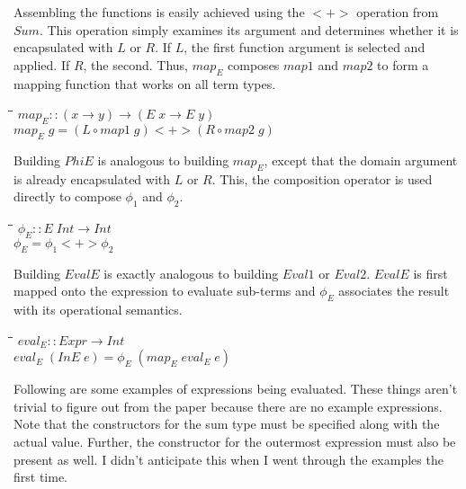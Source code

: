 \documentclass[10pt]{article}
\newlength{\lwidth}\setlength{\lwidth}{4.5cm}
\newlength{\cwidth}\setlength{\cwidth}{8mm} %
\newcommand{\Conid}[1]{\mathit{#1}}
\newcommand{\Varid}[1]{\mathit{#1}}
\begin{document}
Assembling the functions is easily achieved using the \ensuremath{\mathbin{<+>}} operation
from \ensuremath{\Conid{Sum}}.  This operation simply examines its argument and
determines whether it is encapsulated with \ensuremath{\Conid{L}} or \ensuremath{\Conid{R}}. If \ensuremath{\Conid{L}}, the
first function argument is selected and applied.  If \ensuremath{\Conid{R}}, the second.
Thus, \ensuremath{\Varid{map}_E} composes \ensuremath{\Varid{map1}} and \ensuremath{\Varid{map2}} to form a mapping function
that works on all term types.

\begin{tabbing}
\qquad\=\hspace{\lwidth}\=\hspace{\cwidth}\=\+\kill
${\Varid{map}_E\mathbin{::}(\Varid{x}\to \Varid{y})\to (\Conid{E}\;\Varid{x}\to \Conid{E}\;\Varid{y})}$\\
${\Varid{map}_E\;\Varid{g}\mathrel{=}(\Conid{L}\mathbin{\circ}\Varid{map1}\;\Varid{g})\mathbin{<+>}(\Conid{R}\mathbin{\circ}\Varid{map2}\;\Varid{g})}$
\end{tabbing}
Building \ensuremath{\Conid{PhiE}} is analogous to building \ensuremath{\Varid{map}_E}, except that the
domain argument is already encapsulated with \ensuremath{\Conid{L}} or \ensuremath{\Conid{R}}.  This, the
composition operator is used directly to compose \ensuremath{\Varid{\phi_1}} and \ensuremath{\Varid{\phi_2}}.

\begin{tabbing}
\qquad\=\hspace{\lwidth}\=\hspace{\cwidth}\=\+\kill
${\Varid{\phi}_E\mathbin{::}\Conid{E}\;\Conid{Int}\to \Conid{Int}}$\\
${\Varid{\phi}_E\mathrel{=}\Varid{\phi_1}\mathbin{<+>}\Varid{\phi_2}}$
\end{tabbing}
Building \ensuremath{\Conid{EvalE}} is exactly analogous to building \ensuremath{\Conid{Eval1}} or \ensuremath{\Conid{Eval2}}.
\ensuremath{\Conid{EvalE}} is first mapped onto the expression to evaluate sub-terms and
\ensuremath{\Varid{\phi}_E} associates the result with its operational semantics.

\begin{tabbing}
\qquad\=\hspace{\lwidth}\=\hspace{\cwidth}\=\+\kill
${\Varid{eval}_E\mathbin{::}\Conid{Expr}\to \Conid{Int}}$\\
${\Varid{eval}_E\;(\Conid{InE}\;\Varid{e})\mathrel{=}\Varid{\phi}_E\;(\Varid{map}_E\;\Varid{eval}_E\;\Varid{e})}$
\end{tabbing}
Following are some examples of expressions being evaluated.  These
things aren't trivial to figure out from the paper because there are
no example expressions.  Note that the constructors for the sum type
must be specified along with the actual value.  Further, the
constructor for the outermost expression must also be present as well.
I didn't anticipate this when I went through the examples the first
time.
\end{document}
